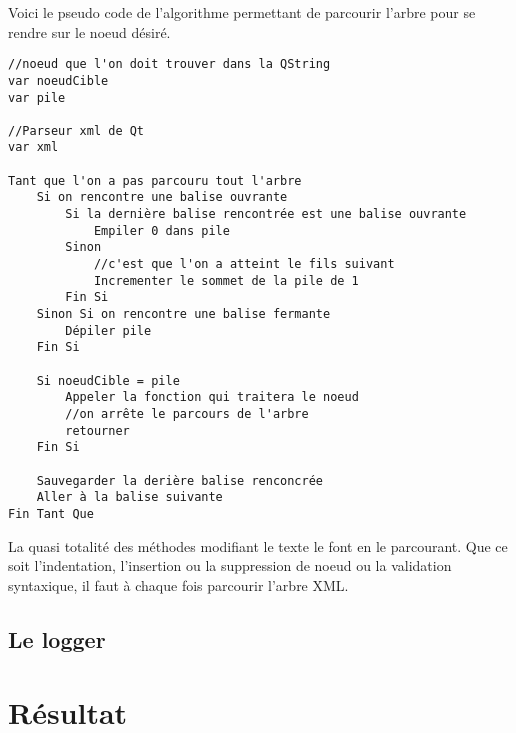 Voici le pseudo code de l'algorithme permettant de parcourir l'arbre pour se rendre sur le noeud désiré.

\begin{verbatim}
//noeud que l'on doit trouver dans la QString
var noeudCible
var pile

//Parseur xml de Qt
var xml

Tant que l'on a pas parcouru tout l'arbre
    Si on rencontre une balise ouvrante
        Si la dernière balise rencontrée est une balise ouvrante
            Empiler 0 dans pile
        Sinon
            //c'est que l'on a atteint le fils suivant
            Incrementer le sommet de la pile de 1
        Fin Si
    Sinon Si on rencontre une balise fermante
        Dépiler pile
    Fin Si
    
    Si noeudCible = pile
        Appeler la fonction qui traitera le noeud
        //on arrête le parcours de l'arbre
        retourner
    Fin Si
   
    Sauvegarder la derière balise renconcrée
    Aller à la balise suivante
Fin Tant Que
\end{verbatim}
 

La quasi totalité des méthodes modifiant le texte le font en le parcourant. Que ce soit l'indentation, l'insertion ou la suppression de noeud ou la validation syntaxique, il faut à chaque fois parcourir l'arbre XML. 
\subsection{Le logger}

\section{Résultat}
